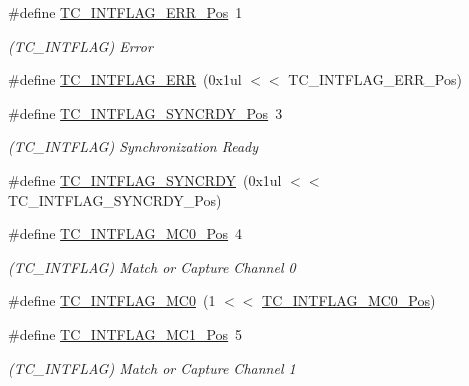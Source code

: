 \begin{DoxyCompactItemize}
\item 
\#define \mbox{\hyperlink{group___s_a_m_d21___t_c_ga62b71a1389f803452a9d1c1b56c3acc2}{T\+C\+\_\+\+I\+N\+T\+F\+L\+A\+G\+\_\+\+E\+R\+R\+\_\+\+Pos}}~1
\begin{DoxyCompactList}\small\item\em (T\+C\+\_\+\+I\+N\+T\+F\+L\+AG) Error \end{DoxyCompactList}\item 
\#define \mbox{\hyperlink{group___s_a_m_d21___t_c_ga00c7ee884665fb362e9d2741667ec9f9}{T\+C\+\_\+\+I\+N\+T\+F\+L\+A\+G\+\_\+\+E\+RR}}~(0x1ul $<$$<$ T\+C\+\_\+\+I\+N\+T\+F\+L\+A\+G\+\_\+\+E\+R\+R\+\_\+\+Pos)
\item 
\#define \mbox{\hyperlink{group___s_a_m_d21___t_c_ga5f49c7d22280542879345e49cdd7ef0b}{T\+C\+\_\+\+I\+N\+T\+F\+L\+A\+G\+\_\+\+S\+Y\+N\+C\+R\+D\+Y\+\_\+\+Pos}}~3
\begin{DoxyCompactList}\small\item\em (T\+C\+\_\+\+I\+N\+T\+F\+L\+AG) Synchronization Ready \end{DoxyCompactList}\item 
\#define \mbox{\hyperlink{group___s_a_m_d21___t_c_ga2cdf5567ea6a05f99a14b16e9ceb85ec}{T\+C\+\_\+\+I\+N\+T\+F\+L\+A\+G\+\_\+\+S\+Y\+N\+C\+R\+DY}}~(0x1ul $<$$<$ T\+C\+\_\+\+I\+N\+T\+F\+L\+A\+G\+\_\+\+S\+Y\+N\+C\+R\+D\+Y\+\_\+\+Pos)
\item 
\#define \mbox{\hyperlink{group___s_a_m_d21___t_c_gaf1e92336aae706c045911074e8e70a1f}{T\+C\+\_\+\+I\+N\+T\+F\+L\+A\+G\+\_\+\+M\+C0\+\_\+\+Pos}}~4
\begin{DoxyCompactList}\small\item\em (T\+C\+\_\+\+I\+N\+T\+F\+L\+AG) Match or Capture Channel 0 \end{DoxyCompactList}\item 
\#define \mbox{\hyperlink{group___s_a_m_d21___t_c_gaf2c5f2a6dcf1a87cbef2274f2a9bdb66}{T\+C\+\_\+\+I\+N\+T\+F\+L\+A\+G\+\_\+\+M\+C0}}~(1 $<$$<$ \mbox{\hyperlink{group___s_a_m_d21___t_c_gaf1e92336aae706c045911074e8e70a1f}{T\+C\+\_\+\+I\+N\+T\+F\+L\+A\+G\+\_\+\+M\+C0\+\_\+\+Pos}})
\item 
\#define \mbox{\hyperlink{group___s_a_m_d21___t_c_ga9c6179be84cccbc9275e14b7cde48723}{T\+C\+\_\+\+I\+N\+T\+F\+L\+A\+G\+\_\+\+M\+C1\+\_\+\+Pos}}~5
\begin{DoxyCompactList}\small\item\em (T\+C\+\_\+\+I\+N\+T\+F\+L\+AG) Match or Capture Channel 1 \end{DoxyCompactList}\item 
$$
\end{DoxyCompactItemize}
